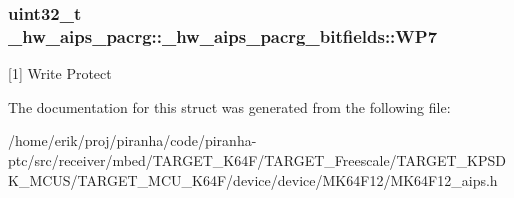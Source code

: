 \subsubsection[{\texorpdfstring{W\+P7}{WP7}}]{\setlength{\rightskip}{0pt plus 5cm}uint32\+\_\+t \+\_\+hw\+\_\+aips\+\_\+pacrg\+::\+\_\+hw\+\_\+aips\+\_\+pacrg\+\_\+bitfields\+::\+W\+P7}\hypertarget{struct__hw__aips__pacrg_1_1__hw__aips__pacrg__bitfields_aa2005fd965a7b5c4d25737e1392c814c}{}\label{struct__hw__aips__pacrg_1_1__hw__aips__pacrg__bitfields_aa2005fd965a7b5c4d25737e1392c814c}
\mbox{[}1\mbox{]} Write Protect 

The documentation for this struct was generated from the following file\+:\begin{DoxyCompactItemize}
\item 
/home/erik/proj/piranha/code/piranha-\/ptc/src/receiver/mbed/\+T\+A\+R\+G\+E\+T\+\_\+\+K64\+F/\+T\+A\+R\+G\+E\+T\+\_\+\+Freescale/\+T\+A\+R\+G\+E\+T\+\_\+\+K\+P\+S\+D\+K\+\_\+\+M\+C\+U\+S/\+T\+A\+R\+G\+E\+T\+\_\+\+M\+C\+U\+\_\+\+K64\+F/device/device/\+M\+K64\+F12/M\+K64\+F12\+\_\+aips.\+h\end{DoxyCompactItemize}
